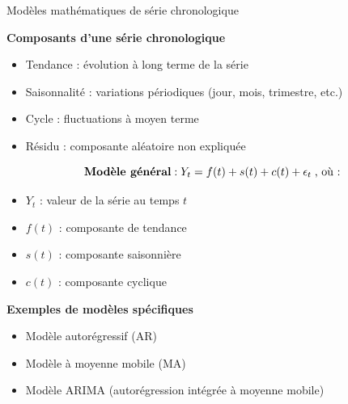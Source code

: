 \documentclass{beamer}
\begin{document}
\begin{frame}{Modèles mathématiques de série chronologique}
	
	

	
	\textbf{Composants d'une série chronologique}
	\begin{itemize}
		\item Tendance : évolution à long terme de la série
		\item Saisonnalité : variations périodiques (jour, mois, trimestre, etc.)
		\item Cycle : fluctuations à moyen terme
		\item Résidu : composante aléatoire non expliquée
	\end{itemize}

	\begin{equation*}
\text{	\textbf{Modèle général}}:		Y_t = f(t) + s(t) + c(t) + \epsilon_t   \; \text{,	où :}
	\end{equation*}
	\begin{itemize}
		\item $Y_t$ : valeur de la série au temps $t$
		\item $f(t)$ : composante de tendance
		\item $s(t)$ : composante saisonnière
		\item $c(t)$ : composante cyclique
	\end{itemize}
	\textbf{Exemples de modèles spécifiques}
	\begin{itemize}
		\item Modèle autorégressif (AR)
		\item Modèle à moyenne mobile (MA)
		\item Modèle ARIMA (autorégression intégrée à moyenne mobile)
	\end{itemize}
	
\end{frame}
\end{document}

